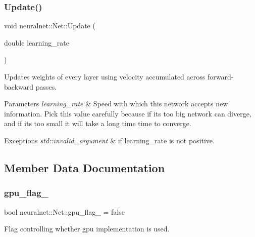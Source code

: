 \subsubsection{\texorpdfstring{Update()}{Update()}}
{\footnotesize\ttfamily void neuralnet\+::\+Net\+::\+Update (\begin{DoxyParamCaption}\item[{double}]{learning\+\_\+rate }\end{DoxyParamCaption})\hspace{0.3cm}{\ttfamily [virtual]}}



Updates weights of every layer using velocity accumulated across forward-\/backward passes. 


\begin{DoxyParams}{Parameters}
{\em learning\+\_\+rate} & Speed with which this network accepts new information. Pick this value carefully because if it\textquotesingle{}s too big network can diverge, and if it\textquotesingle{}s too small it will take a long time time to converge. \\
\hline
\end{DoxyParams}

\begin{DoxyExceptions}{Exceptions}
{\em std\+::invalid\+\_\+argument} & if learning\+\_\+rate is not positive. \\
\hline
\end{DoxyExceptions}


\subsection{Member Data Documentation}
\mbox{\label{classneuralnet_1_1Net_aa84c702ce8abcb7b034348d94f919838}} 
\subsubsection{\texorpdfstring{gpu\+\_\+flag\+\_\+}{gpu\_flag\_}}
{\footnotesize\ttfamily bool neuralnet\+::\+Net\+::gpu\+\_\+flag\+\_\+ = false\hspace{0.3cm}{\ttfamily [protected]}}

Flag controlling whether gpu implementation is used. \mbox{\label{classneuralnet_1_1Net_ae229ac240ce45c28d36d82bfb9bc1049}} 
